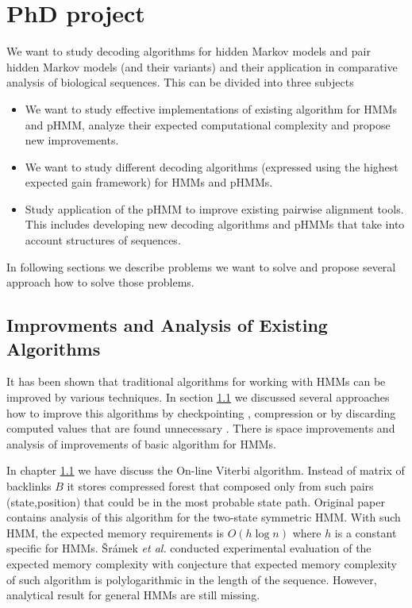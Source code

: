 \chapter{PhD project}

We want to study decoding algorithms for hidden Markov models and pair hidden
Markov models (and their variants) and their application in comparative analysis
of biological sequences. This can be divided into three subjects
\begin{itemize}
\item We want to study effective implementations of existing algorithm for HMMs
and pHMM, analyze their expected computational complexity and propose new
improvements.

\item We want to study different decoding algorithms (expressed using the
highest expected gain framework) for HMMs and pHMMs.

\item Study application of the pHMM to improve existing pairwise alignment
tools. This includes developing new decoding algorithms and pHMMs that take into
account structures of sequences.
\end{itemize}
In following sections we describe problems we want to solve and propose several
approach how to solve those problems.


\section{Improvments and Analysis of Existing Algorithms}

It has been shown that traditional algorithms for working with HMMs can be
improved by various techniques. In section \ref{} we discussed several
approaches how to improve this algorithms by checkpointing \cite{}, compression
\cite{} or by discarding computed values that are found unnecessary \cite{}.
There is space improvements and analysis of improvements of basic algorithm for
HMMs.

In chapter \ref{} we have discuss the  On-line Viterbi algorithm. Instead of
matrix of backlinks $B$ it stores compressed forest that composed only from such 
pairs (state,position) that could be in the most probable state path.
Original paper \cite{} contains analysis of this algorithm for the two-state
symmetric HMM. With such HMM, the expected memory requirements is $O(h\log n)$
where $h$ is a constant specific for HMMs. Šrámek {\it et al.} conducted
experimental evaluation of the expected memory complexity with conjecture that
expected memory complexity of such algorithm is polylogarithmic in the length of
the sequence. However, analytical result for general HMMs are still missing.

